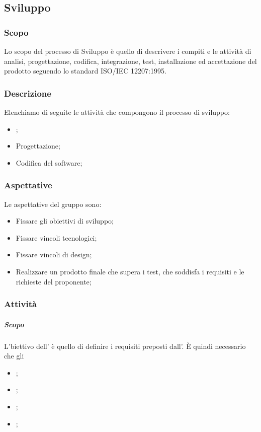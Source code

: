 \subsection{Sviluppo}
\subsubsection{Scopo}
Lo scopo del processo di Sviluppo è quello di descrivere i compiti e le attività di analisi, progettazione, codifica, integrazione, test, installazione ed accettazione del prodotto seguendo lo standard ISO/IEC 12207:1995.

\subsubsection{Descrizione}
Elenchiamo di seguite le attività che compongono il processo di sviluppo:
\begin{itemize}
    \item{\AdR{};}
    \item{Progettazione;}
    \item{Codifica del software;}
\end{itemize}

\subsubsection{Aspettative}
Le aspettative del gruppo sono:
\begin{itemize}
    \item{Fissare gli obiettivi di sviluppo;}
    \item{Fissare vincoli tecnologici;}
    \item{Fissare vincoli di design;}
    \item{Realizzare un prodotto finale che supera i test, che soddisfa i requisiti e le richieste del proponente;}
\end{itemize}

\subsubsection{Attività}
\paragraph{\AdR{}}
\subparagraph{Scopo} L'biettivo dell'\AdRv{} è quello di definire i requisiti preposti dall'\proponProg{}. È quindi necessario che gli \analProg
\begin{itemize}
    \item{;}
    \item{;}
    \item{;}
    \item{;}
\end{itemize}

